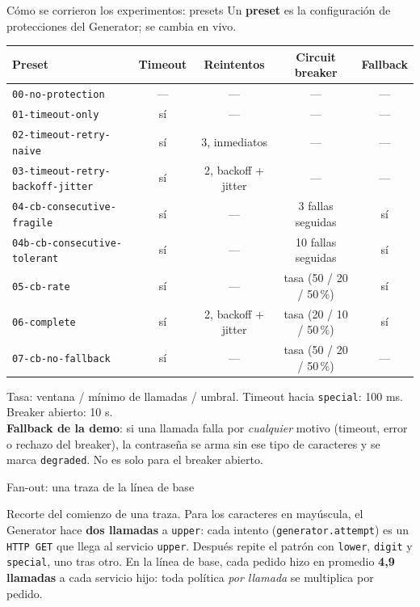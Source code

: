 \documentclass[institutional,screen,none]{ua-engineering-v6-beamer}
\begin{document}
\begin{frame}{Cómo se corrieron los experimentos: presets}
Un \textbf{preset} es la configuración de protecciones del Generator; se cambia en vivo.

\begin{center}
\scriptsize
\setlength{\tabcolsep}{4pt}
\begin{tabular}{lcccc}
\toprule
\textbf{Preset} & \textbf{Timeout} & \textbf{Reintentos} & \textbf{Circuit breaker} & \textbf{Fallback} \\
\midrule
\texttt{00-no-protection} & --- & --- & --- & --- \\
\texttt{01-timeout-only} & sí & --- & --- & --- \\
\texttt{02-timeout-retry-naive} & sí & 3, inmediatos & --- & --- \\
\texttt{03-timeout-retry-backoff-jitter} & sí & 2, backoff + jitter & --- & --- \\
\texttt{04-cb-consecutive-fragile} & sí & --- & 3 fallas seguidas & sí \\
\texttt{04b-cb-consecutive-tolerant} & sí & --- & 10 fallas seguidas & sí \\
\texttt{05-cb-rate} & sí & --- & tasa (50 / 20 / 50\,\%) & sí \\
\texttt{06-complete} & sí & 2, backoff + jitter & tasa (20 / 10 / 50\,\%) & sí \\
\texttt{07-cb-no-fallback} & sí & --- & tasa (50 / 20 / 50\,\%) & --- \\
\bottomrule
\end{tabular}
\end{center}

{\footnotesize Tasa: ventana / mínimo de llamadas / umbral. Timeout hacia \texttt{special}: 100 ms. Breaker abierto: 10 s.\\
\textbf{Fallback de la demo}: si una llamada falla por \emph{cualquier} motivo (timeout, error o rechazo del breaker), la contraseña se arma sin ese tipo de caracteres y se marca \texttt{degraded}. No es solo para el breaker abierto.}
\end{frame}

\begin{frame}{Fan-out: una traza de la línea de base}

{\footnotesize Recorte del comienzo de una traza. Para los caracteres en mayúscula, el Generator hace \textbf{dos llamadas} a \texttt{upper}: cada intento (\texttt{generator.attempt}) es un \texttt{HTTP GET} que llega al servicio \texttt{upper}. Después repite el patrón con \texttt{lower}, \texttt{digit} y \texttt{special}, uno tras otro. En la línea de base, cada pedido hizo en promedio \textbf{4,9 llamadas} a cada servicio hijo: toda política \emph{por llamada} se multiplica por pedido.}
\end{frame}
\end{document}
